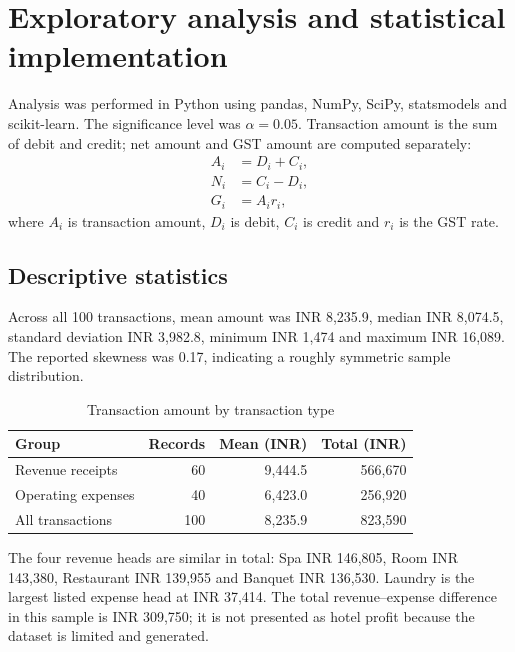 \documentclass[11pt,a4paper]{article}
\begin{document}
\section{Exploratory analysis and statistical implementation}
Analysis was performed in Python using pandas, NumPy, SciPy, statsmodels and scikit-learn. The significance level was $\alpha=0.05$. Transaction amount is the sum of debit and credit; net amount and GST amount are computed separately:
\begin{align}
  A_i &= D_i + C_i, \\
  N_i &= C_i - D_i, \\
  G_i &= A_i r_i,
\end{align}
where $A_i$ is transaction amount, $D_i$ is debit, $C_i$ is credit and $r_i$ is the GST rate.

\subsection{Descriptive statistics}
Across all 100 transactions, mean amount was INR 8,235.9, median INR 8,074.5, standard deviation INR 3,982.8, minimum INR 1,474 and maximum INR 16,089. The reported skewness was 0.17, indicating a roughly symmetric sample distribution.

\begin{table}[H]
\centering
\caption{Transaction amount by transaction type}
\begin{tabularx}{0.9\textwidth}{>{\raggedright\arraybackslash}Xrrr}
\toprule
Group & Records & Mean (INR) & Total (INR)\\
\midrule
Revenue receipts & 60 & 9,444.5 & 566,670\\
Operating expenses & 40 & 6,423.0 & 256,920\\
All transactions & 100 & 8,235.9 & 823,590\\
\bottomrule
\end{tabularx}
\end{table}

\clearpage
\pagestyle{fancy}
\begin{samepage}
The four revenue heads are similar in total: Spa INR 146,805, Room INR 143,380, Restaurant INR 139,955 and Banquet INR 136,530. Laundry is the largest listed expense head at INR 37,414. The total revenue--expense difference in this sample is INR 309,750; it is not presented as hotel profit because the dataset is limited and generated.
\end{samepage}
\end{document}
